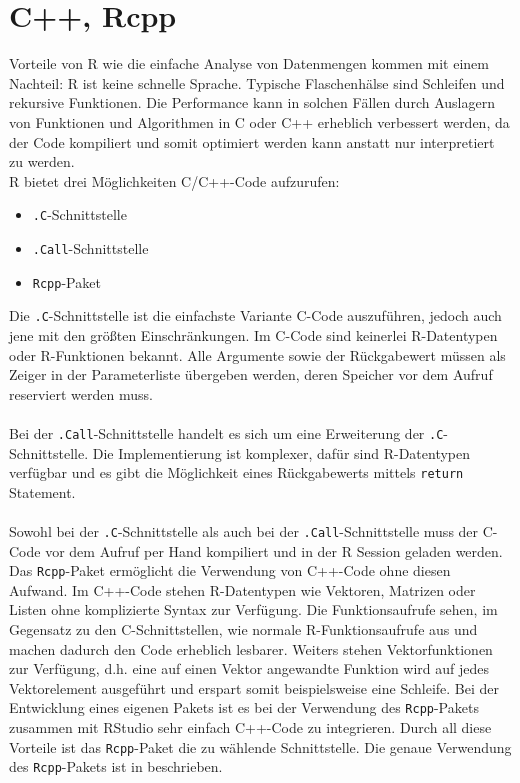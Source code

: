 \section{C++, Rcpp}
\label{kapitel:rcpp}
Vorteile von R wie die einfache Analyse von Datenmengen kommen mit einem Nachteil: R ist keine schnelle Sprache. Typische Flaschenhälse sind Schleifen und rekursive Funktionen. Die Performance kann in solchen Fällen durch Auslagern von Funktionen und Algorithmen in C oder C++ erheblich verbessert werden, da der Code kompiliert und somit optimiert werden kann anstatt nur interpretiert zu werden.\\
R bietet drei Möglichkeiten C/C++-Code aufzurufen:
\begin{itemize}
	\item \texttt{.C}-Schnittstelle
	\item \texttt{.Call}-Schnittstelle
	\item \texttt{Rcpp}-Paket
\end{itemize}
Die \texttt{.C}-Schnittstelle ist die einfachste Variante C-Code auszuführen, jedoch auch jene mit den größten Einschränkungen. Im C-Code sind keinerlei R-Datentypen oder R-Funktionen bekannt. Alle Argumente sowie der Rückgabewert müssen als Zeiger in der Parameterliste übergeben werden, deren Speicher vor dem Aufruf reserviert werden muss.
\\
\\
Bei der \texttt{.Call}-Schnittstelle handelt es sich um eine Erweiterung der \texttt{.C}-Schnittstelle. Die Implementierung ist komplexer, dafür sind R-Datentypen verfügbar und es gibt die Möglichkeit eines Rückgabewerts mittels \texttt{return} Statement. \cite{wickham2015r}
\\
\\
Sowohl bei der \texttt{.C}-Schnittstelle als auch bei der \texttt{.Call}-Schnittstelle muss der C-Code vor dem Aufruf per Hand kompiliert und in der R Session geladen werden. Das \texttt{Rcpp}-Paket ermöglicht die Verwendung von C++-Code ohne diesen Aufwand. Im C++-Code stehen R-Datentypen wie Vektoren, Matrizen oder Listen ohne komplizierte Syntax zur Verfügung. Die Funktionsaufrufe sehen, im Gegensatz zu den C-Schnittstellen, wie normale R-Funktionsaufrufe aus und machen dadurch den Code erheblich lesbarer. Weiters stehen Vektorfunktionen zur Verfügung, d.h. eine auf einen Vektor angewandte Funktion wird auf jedes Vektorelement ausgeführt und erspart somit beispielsweise eine Schleife. Bei der Entwicklung eines eigenen Pakets ist es bei der Verwendung des \texttt{Rcpp}-Pakets zusammen mit RStudio sehr einfach C++-Code zu integrieren. Durch all diese Vorteile ist das \texttt{Rcpp}-Paket die zu wählende Schnittstelle. Die genaue Verwendung des \texttt{Rcpp}-Pakets ist in \cite{wickham2015advanced} beschrieben.

